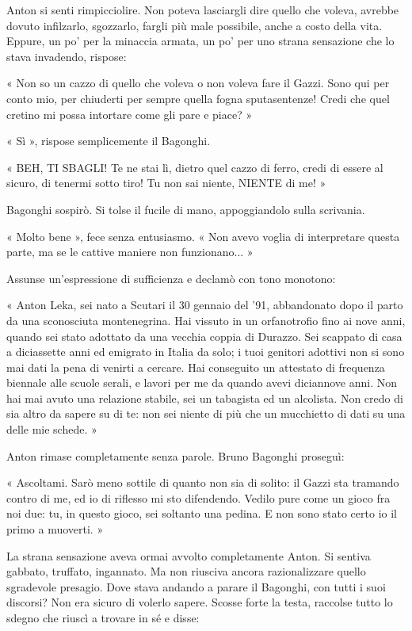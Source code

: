 Anton si senti rimpicciolire. Non poteva lasciargli dire quello che voleva, avrebbe dovuto infilzarlo, sgozzarlo, fargli più male possibile, anche a costo della vita. Eppure, un po' per la minaccia armata, un po' per uno strana sensazione che lo stava invadendo, rispose:

« Non so un cazzo di quello che voleva o non voleva fare il Gazzi. Sono qui per conto mio, per chiuderti per sempre quella fogna sputasentenze! Credi che quel cretino mi possa intortare come gli pare e piace? »

« Sì », rispose semplicemente il Bagonghi.

« BEH, TI SBAGLI! Te ne stai lì, dietro quel cazzo di ferro, credi di essere al sicuro, di tenermi sotto tiro! Tu non sai niente, NIENTE di me! »

Bagonghi sospirò. Si tolse il fucile di mano, appoggiandolo sulla scrivania.

« Molto bene », fece senza entusiasmo. « Non avevo voglia di interpretare questa parte, ma se le cattive maniere non funzionano... »

Assunse un'espressione di sufficienza e declamò con tono monotono:

« Anton Leka, sei nato a Scutari il 30 gennaio del '91, abbandonato dopo il parto da una sconosciuta montenegrina. Hai vissuto in un orfanotrofio fino ai nove anni, quando sei stato adottato da una vecchia coppia di Durazzo. Sei scappato di casa a diciassette anni ed emigrato in Italia da solo; i tuoi genitori adottivi non si sono mai dati la pena di venirti a cercare. Hai conseguito un attestato di frequenza biennale alle scuole serali, e lavori per me da quando avevi diciannove anni. Non hai mai avuto una relazione stabile, sei un tabagista ed un alcolista. Non credo di sia altro da sapere su di te: non sei niente di più che un mucchietto di dati su una delle mie schede. »

Anton rimase completamente senza parole. Bruno Bagonghi proseguì:

« Ascoltami. Sarò meno sottile di quanto non sia di solito: il Gazzi sta tramando contro di me, ed io di riflesso mi sto difendendo. Vedilo pure come un gioco fra noi due: tu, in questo gioco, sei soltanto una pedina. E non sono stato certo io il primo a muoverti. »

La strana sensazione aveva ormai avvolto completamente Anton. Si sentiva gabbato, truffato, ingannato. Ma non riusciva ancora razionalizzare quello sgradevole presagio. Dove stava andando a parare il Bagonghi, con tutti i suoi discorsi? Non era sicuro di volerlo sapere. Scosse forte la testa, raccolse tutto lo sdegno che riuscì a trovare in sé e disse:

